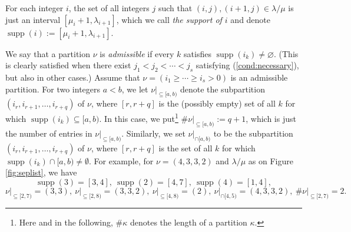 \documentclass[numbers=enddot,12pt,final,onecolumn,notitlepage]{scrartcl}%
\theoremstyle{definition}
\def\seplistvar{{{\nu}}} %
\def\supp{{\operatorname{supp}}}
\def\lm{{\lambda/\mu}}
\begin{document}
\begin{comment}
 
\footnote{By this, we mean that $\lm$ has at least one
cell, and cannot be represented
as a disjoint union of two nonempty skew partitions $\alpha/\beta$
and $\gamma/\delta$ such that no cell of $\alpha/\beta$ is adjacent
to any cell of $\gamma/\delta$. This is a harmless assumption,
since every skew partition $\lm$ can be written as a disjoint union
of such connected skew partitions, and these ``connected
components'' do not interact when it comes to studying rpps:
Choosing a 12-rpp of shape $\lm$ is tantamount to choosing
a 12-rpp for each of these components; and choosing a 12-rpp of
shape $\lm$ with seplist-partition equal to a given partition
$\seplistvar$ is tantamount to choosing a 12-rpp for each of the
components with seplist-partition equal to the ``appropriate piece''
of $\seplistvar$. (What an ``appropriate piece'' is should be
clear enough, since two distinct connected components are supported
on different rows.)}.

\end{comment}

\newcommand{\nuxy}[2]{\seplistvar\big|_{\subseteq[#1,#2)}}
\newcommand{\nuxycap}[2]{\seplistvar\big|_{\cap[#1,#2)}}
\newcommand{\nupxy}[2]{\seplistvar^{\prime}\big|_{\subseteq[#1,#2)}}

\def\nuab{\nuxy{a}{b}}
\def\nuabcap{\nuxycap{a}{b}}



For each integer $i$, the set of all integers $j$ such that $(i,j),(i+1,j)\in\lm$ is just an interval $[\mu_{i}+1,\lambda_{i+1}]$, which we call \textit{the support of $i$} and denote $\supp(i):=[\mu_{i}+1,\lambda_{i+1}]$.

We say that a partition $\seplistvar$ is \textit{admissible} if
every $k$ satisfies $\supp(i_k) \neq \varnothing$. (This is
clearly satisfied when there exist $j_1<j_2<\cdots<j_s$
satisfying (\ref{cond:necessary}), but also in other cases.)
Assume that $\seplistvar = \left(i_1 \geq \cdots \geq i_s > 0\right)$ is an admissible partition.
For two integers $a< b$, we let $\nuab$ denote the subpartition $(i_r,i_{r+1},\dots,i_{r+q})$ of $\seplistvar$, where $[r, r+q]$ is the (possibly empty) set of all $k$ for which $\supp(i_k)\subseteq [a,b)$. In this case, we put\footnote{Here and in the following, $\#\kappa$ denotes the length of a partition $\kappa$.} $\#\nuab:=q+1$, which is just the number of entries in $\nuab$. Similarly, we set $\nuabcap$ to be the subpartition $(i_r,i_{r+1},\dots,i_{r+q})$ of $\seplistvar$, where $[r, r+q]$ is the set of all $k$ for which $\supp(i_k)\cap [a,b)\neq\emptyset$.
For example, for $\seplistvar=(4,3,3,2)$ and $\lm$ as on Figure \ref{fig:seplist}, we have 
$$\supp(3)=[3,4],\ \supp(2)=[4,7],\ \supp(4)=[1,4],$$ 
$$\nuxy{2}{7}=(3,3),\ \nuxy{2}{8}=(3,3,2),\ \nuxy{4}{8}=(2),\ \nuxycap{4}{5}=(4,3,3,2),\ \#\nuxy{2}{7}=2.$$
\end{document}

